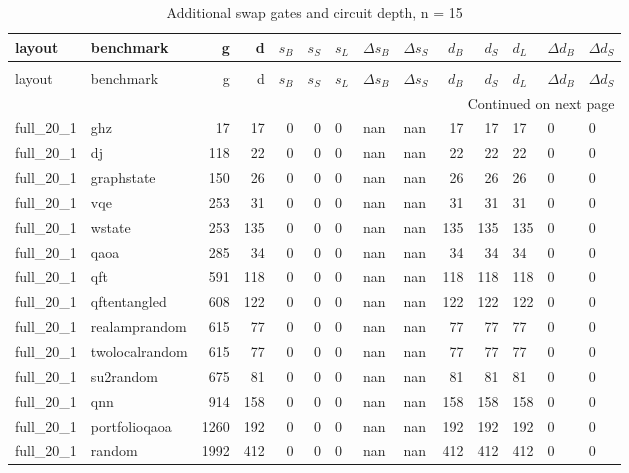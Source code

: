 \thispagestyle{empty}
\begin{longtable}{llrrrrlllrrlll}
\caption{Additional swap gates and circuit depth, n = 15} \label{benchmark-table-15} \\
\toprule
layout & benchmark & g & d & $s_B$ & $s_S$ & $s_L$ & $\Delta s_B$ & $\Delta s_S$ & $d_B$ & $d_S$ & $d_L$ & $\Delta d_B$ & $\Delta d_S$ \\
\midrule
\endfirsthead
\caption[]{Additional swap gates and circuit depth, n = 15} \\
\toprule
layout & benchmark & g & d & $s_B$ & $s_S$ & $s_L$ & $\Delta s_B$ & $\Delta s_S$ & $d_B$ & $d_S$ & $d_L$ & $\Delta d_B$ & $\Delta d_S$ \\
\midrule
\endhead
\midrule
\multicolumn{14}{r}{Continued on next page} \\
\midrule
\endfoot
\bottomrule
\endlastfoot
full\_20\_1 & ghz & 17 & 17 & 0 & 0 & 0 & nan & nan & 17 & 17 & 17 & 0 & 0 \\
full\_20\_1 & dj & 118 & 22 & 0 & 0 & 0 & nan & nan & 22 & 22 & 22 & 0 & 0 \\
full\_20\_1 & graphstate & 150 & 26 & 0 & 0 & 0 & nan & nan & 26 & 26 & 26 & 0 & 0 \\
full\_20\_1 & vqe & 253 & 31 & 0 & 0 & 0 & nan & nan & 31 & 31 & 31 & 0 & 0 \\
full\_20\_1 & wstate & 253 & 135 & 0 & 0 & 0 & nan & nan & 135 & 135 & 135 & 0 & 0 \\
full\_20\_1 & qaoa & 285 & 34 & 0 & 0 & 0 & nan & nan & 34 & 34 & 34 & 0 & 0 \\
full\_20\_1 & qft & 591 & 118 & 0 & 0 & 0 & nan & nan & 118 & 118 & 118 & 0 & 0 \\
full\_20\_1 & qftentangled & 608 & 122 & 0 & 0 & 0 & nan & nan & 122 & 122 & 122 & 0 & 0 \\
full\_20\_1 & realamprandom & 615 & 77 & 0 & 0 & 0 & nan & nan & 77 & 77 & 77 & 0 & 0 \\
full\_20\_1 & twolocalrandom & 615 & 77 & 0 & 0 & 0 & nan & nan & 77 & 77 & 77 & 0 & 0 \\
full\_20\_1 & su2random & 675 & 81 & 0 & 0 & 0 & nan & nan & 81 & 81 & 81 & 0 & 0 \\
full\_20\_1 & qnn & 914 & 158 & 0 & 0 & 0 & nan & nan & 158 & 158 & 158 & 0 & 0 \\
full\_20\_1 & portfolioqaoa & 1260 & 192 & 0 & 0 & 0 & nan & nan & 192 & 192 & 192 & 0 & 0 \\
full\_20\_1 & random & 1992 & 412 & 0 & 0 & 0 & nan & nan & 412 & 412 & 412 & 0 & 0 \\

\end{longtable}

